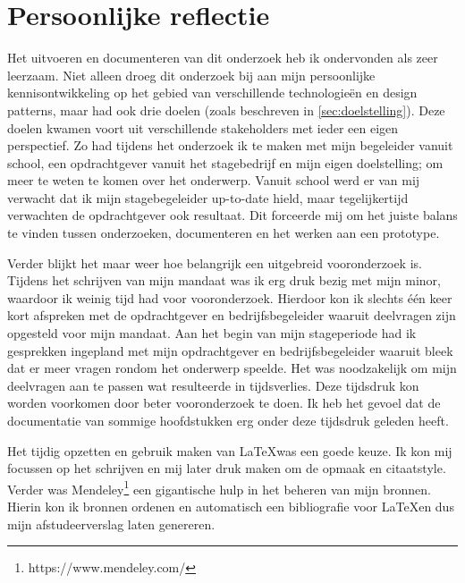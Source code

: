 \chapter{Persoonlijke reflectie}
\label{ch:reflection}
Het uitvoeren en documenteren van dit onderzoek heb ik ondervonden als zeer leerzaam. Niet alleen droeg dit onderzoek bij aan mijn persoonlijke kennisontwikkeling op het gebied van verschillende technologieën en design patterns, maar had ook drie doelen (zoals beschreven in \autoref{sec:doelstelling}). Deze doelen kwamen voort uit verschillende stakeholders met ieder een eigen perspectief. Zo had tijdens het onderzoek ik te maken met mijn begeleider vanuit school, een opdrachtgever vanuit het stagebedrijf en mijn eigen doelstelling; om meer te weten te komen over het onderwerp. Vanuit school werd er van mij verwacht dat ik mijn stagebegeleider up-to-date hield, maar tegelijkertijd verwachten de opdrachtgever ook resultaat. Dit forceerde mij om het juiste balans te vinden tussen onderzoeken, documenteren en het werken aan een prototype.

Verder blijkt het maar weer hoe belangrijk een uitgebreid vooronderzoek is. Tijdens het schrijven van mijn mandaat was ik erg druk bezig met mijn minor, waardoor ik weinig tijd had voor vooronderzoek. Hierdoor kon ik slechts één keer kort afspreken met de opdrachtgever en bedrijfsbegeleider waaruit deelvragen zijn opgesteld voor mijn mandaat. Aan het begin van mijn stageperiode had ik gesprekken ingepland met mijn opdrachtgever en bedrijfsbegeleider waaruit bleek dat er meer vragen rondom het onderwerp speelde. Het was noodzakelijk om mijn deelvragen aan te passen wat resulteerde in tijdsverlies. Deze tijdsdruk kon worden voorkomen door beter vooronderzoek te doen. Ik heb het gevoel dat de documentatie van sommige hoofdstukken erg onder deze tijdsdruk geleden heeft.

Het tijdig opzetten en gebruik maken van \LaTeX was een goede keuze. Ik kon mij focussen op het schrijven en mij later druk maken om de opmaak en citaatstyle. Verder was Mendeley\footnote{https://www.mendeley.com/} een gigantische hulp in het beheren van mijn bronnen. Hierin kon ik bronnen ordenen en automatisch een bibliografie voor \LaTeX en dus mijn afstudeerverslag laten genereren.

